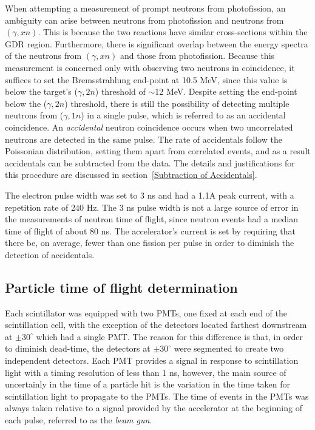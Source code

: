 When attempting a measurement of prompt neutrons from photofission, an ambiguity can arise between neutrons from photofission and neutrons from $(\gamma, xn)$.
This is because the two reactions have similar cross-sections within the GDR region.
Furthermore, there is significant overlap between the energy spectra of the neutrons from $(\gamma, xn)$ and those from photofission.
Because this measurement is concerned only with observing two neutrons in coincidence, it suffices to set the Bremsstrahlung end-point at 10.5 MeV, since this value is below the target's ($\gamma, 2n$) threshold of $\sim$12 MeV.
Despite setting the end-point below the ($\gamma, 2n$) threshold, there is still the possibility of detecting multiple neutrons from ($\gamma, 1n$) in a single pulse, which is referred to as an accidental coincidence.
An \textit{accidental} neutron coincidence occurs when two uncorrelated neutrons are detected in the same pulse.
The rate of accidentals follow the Poissonian distribution, setting them apart from correlated events, and as a result accidentals can be subtracted from the data.
The details and justifications for this procedure are discussed in section~\ref{Subtraction of Accidentals}.

The electron pulse width was set to 3 ns and had a 1.1A peak current, with a repetition rate of 240 Hz.
The 3 ns pulse width is not a large source of error in the measurements of neutron time of flight, since neutron events had a median time of flight of about 80 ns.
The accelerator's current is set by requiring that there be, on average, fewer than one fission per pulse in order to diminish the detection of accidentals.

\subsection{Particle time of flight determination}
\label{reconstruction}
Each scintillator was equipped with two PMTs, one fixed at each end of the scintillation cell, with the exception of the detectors located farthest downstream at $\pm30^{\circ}$ which had a single PMT.
The reason for this difference is that, in order to diminish dead-time, the detectors at $\pm30^{\circ}$ were segmented to create two independent detectors.
Each PMT provides a signal in response to scintillation light with a timing resolution of less than 1 ns, however, the main source of uncertainly in the time of a particle hit is the variation in the time taken for scintillation light to propagate to the PMTs.
The time of events in the PMTs was always taken relative to a signal provided by the accelerator at the beginning of each pulse, referred to as the \textit{beam gun}.

